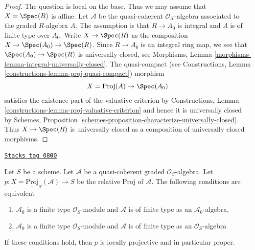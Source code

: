 \begin{proof}
The question is local on the base. Thus we may assume that $X = \Spec(R)$
is affine. Let $\mathcal{A}$ be the quasi-coherent $\mathcal{O}_X$-algebra
associated to the graded $R$-algebra $A$. The assumption is that $R \to A_0$
is integral and $A$ is of finite type over $A_0$.
Write $X \to \Spec(R)$ as the composition $X \to \Spec(A_0) \to \Spec(R)$.
Since $R \to A_0$ is an integral ring map, we see that
$\Spec(A_0) \to \Spec(R)$ is universally closed, see
Morphisms, Lemma \ref{morphisms-lemma-integral-universally-closed}.
The quasi-compact (see
Constructions, Lemma \ref{constructions-lemma-proj-quasi-compact}) morphism
$$
X = \text{Proj}(A) \to \Spec(A_0)
$$
satisfies the existence part of the valuative criterion by
Constructions, Lemma \ref{constructions-lemma-proj-valuative-criterion}
and hence it is universally closed by
Schemes, Proposition \ref{schemes-proposition-characterize-universally-closed}.
Thus $X \to \Spec(R)$ is universally closed as a composition of
universally closed morphisms.
\end{proof}

\begin{lemma}
\label{divisors-lemma-relative-proj-proper}
\href{https://stacks.math.columbia.edu/tag/0800}{\texttt{Stacks tag 0800}}

Let $S$ be a scheme. Let $\mathcal{A}$ be a quasi-coherent graded
$\mathcal{O}_S$-algebra. Let
$p : X = \underline{\text{Proj}}_S(\mathcal{A}) \to S$ be the relative
Proj of $\mathcal{A}$. The following conditions are equivalent
\begin{enumerate}
\item $\mathcal{A}_0$ is a finite type $\mathcal{O}_S$-module
and $\mathcal{A}$ is of finite type as an $\mathcal{A}_0$-algebra,
\item $\mathcal{A}_0$ is a finite type $\mathcal{O}_S$-module
and $\mathcal{A}$ is of finite type as an $\mathcal{O}_S$-algebra
\end{enumerate}
If these conditions hold, then $p$ is locally projective and in
particular proper.
\end{lemma}

